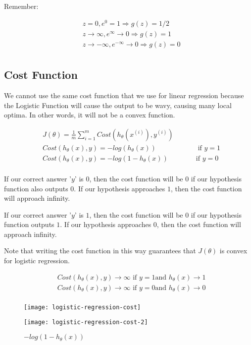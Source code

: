 \noindent Remember:

\begin{align*}
	& z = 0, e^0 = 1 \Rightarrow g(z) = 1/2 \\
	& z \to \infty, e^{\infty} \to 0 \Rightarrow g(z) = 1 \\
	& z \to -\infty, e^{-\infty} \to 0 \Rightarrow g(z) = 0 \\
\end{align*}

\subsection{Cost Function}
We cannot use the same cost function that we use for linear regression because the Logistic Function will cause the output to be wavy, causing many local optima. In other words, it will not be a convex function.

\begin{align*}
	& J(\theta) = \frac{1}{m} \sum_{i=1}^{m}Cost(h_{\theta}(x^{(i)}), y^{(i)}) \\
	& Cost(h_{\theta}(x), y) = -log(h_{\theta}(x)) \qquad\qquad\qquad \text{if } y = 1 \\
	& Cost(h_{\theta}(x), y) = -log(1 - h_{\theta}(x)) \qquad\qquad \text{if } y = 0 \\
\end{align*}

If our correct answer '$y$' is $0$, then the cost function will be $0$ if our hypothesis function also outputs $0$. If our hypothesis approaches $1$, then the cost function will approach infinity.

If our correct answer '$y$' is $1$, then the cost function will be $0$ if our hypothesis function outputs $1$. If our hypothesis approaches $0$, then the cost function will approach infinity.

Note that writing the cost function in this way guarantees that $J(\theta)$ is convex for logistic regression.

\begin{align*}
	& Cost(h_{\theta}(x), y) \to \infty \text{ if } y = 1 \text{and } h_{\theta}(x) \to 1 \\
	& Cost(h_{\theta}(x), y) \to \infty \text{ if } y = 0 \text{and } h_{\theta}(x) \to 0 \\
\end{align*}

\begin{figure}[h]
	\begin{multicols}{2}
	\centering
	\texttt{[image: logistic-regression-cost]}
	\caption{$-log(h_{\theta}(x))$}
	\label{fig:logistic-regression-cost}

	\centering
	\texttt{[image: logistic-regression-cost-2]}
	\caption{$-log(1 - h_{\theta}(x))$}
	\label{fig:logistic-regression-cost-2}
	\end{multicols}
\end{figure}

